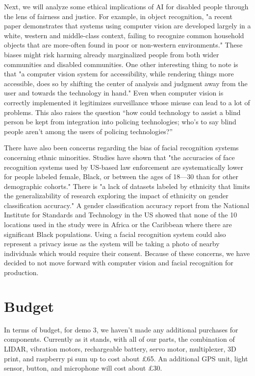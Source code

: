 \documentclass{article}
\begin{document}
Next, we will analyze some ethical implications of AI for disabled people through the lens of fairness and justice. For example, in object recognition, "a recent paper demonstrates that systems using computer vision are developed largely in a white, western and middle-class context, failing to recognize common household objects that are more-often found in poor or non-western environments." \cite{bennettKeyes2019} These biases might risk harming already marginalized people from both wider communities and disabled communities. One other interesting thing to note is that "a computer vision system for accessibility, while rendering things more accessible, does so by shifting the center of analysis and judgment away from the user and towards the technology in hand." \cite{bennettKeyes2019} Even when computer vision is correctly implemented it legitimizes surveillance whose misuse can lead to a lot of problems. This also raises the question “how could technology to assist a blind person be kept from integration into policing technologies; who’s to say blind people aren’t among the users of policing technologies?” \cite{bennettKeyes2019}

There have also been concerns regarding the bias of facial recognition systems concerning ethnic minorities. Studies have shown that "the accuracies of face recognition systems used by US-based law enforcement are systematically lower for people labeled female, Black, or between the ages of 18—30 than for other demographic cohorts." \cite{buolamwiniGebru2018} There is "a lack of datasets labeled by ethnicity that limits the generalizability of research exploring the impact of ethnicity on gender classification accuracy." \cite{buolamwiniGebru2018} A gender classification accuracy report from the National Institute for Standards and Technology in the US showed that none of the 10 locations used in the study were in Africa or the Caribbean where there are significant Black populations. Using a facial recognition system could also represent a privacy issue as the system will be taking a photo of nearby individuals which would require their consent. Because of these concerns, we have decided to not move forward with computer vision and facial recognition for production.

\section{Budget}

In terms of budget, for demo 3, we haven't made any additional purchases for components. Currently as it stands, with all of our parts, the combination of LIDAR, vibration motors, rechargeable battery, servo motor, multiplexer, 3D print, and raspberry pi sum up to cost about £65. An additional GPS unit, light sensor, button, and microphone will cost about £30.
\end{document}

